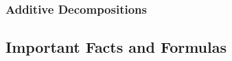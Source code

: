 \subsubsection{Additive Decompositions}


\subsection{Important Facts and Formulas}






\begin{comment}
Explain what happens to the eigenvalues when we do certain things to a matrix (shifts, etc.)
I have a list of that in some text file. Shifting eigenvalues and manipulating them in other ways
can be important to improve convergence of numerical algrithms
\end{comment}
